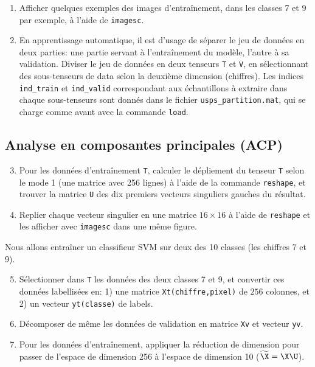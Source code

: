 \begin{enumerate}
	\item Afficher quelques exemples des images d'entraînement, dans les classes 7 et 9 par exemple, à l'aide de \texttt{imagesc}.

	\item En apprentissage automatique, il est d'usage de séparer le jeu de données en deux parties: une partie servant à l'entraînement du modèle, l'autre à sa validation. Diviser le jeu de données en deux tenseurs \texttt{T} et \texttt{V}, en sélectionnant des sous-tenseurs de data selon la deuxième dimension (chiffres). Les indices \texttt{ind\_train} et \texttt{ind\_valid} correspondant aux échantillons à extraire dans chaque sous-tenseurs sont donnés dans le fichier \texttt{usps\_partition.mat}, qui se charge comme avant avec la commande \texttt{load}.
\end{enumerate}

\subsection{Analyse en composantes principales (ACP)}

\begin{enumerate}
\setcounter{enumi}{2}
\item Pour les données d'entraînement \texttt{T}, calculer le dépliement du tenseur \texttt{T} selon le mode 1 (une matrice avec 256 lignes) à l'aide de la commande \texttt{reshape}, et trouver la matrice \texttt{U} des dix premiers vecteurs singuliers gauches du résultat. %

\item Replier chaque vecteur singulier en une matrice  $16 \times 16$ à l'aide de \texttt{reshape} et les afficher avec \texttt{imagesc} dans une même figure.
\end{enumerate}

Nous allons entraîner un classifieur SVM sur deux des 10 classes (les chiffres 7 et 9).

\begin{enumerate}
\setcounter{enumi}{4}
\item Sélectionner dans \texttt{T} les données des deux classes 7 et 9, et convertir ces données labellisées en: 1) une matrice \texttt{Xt(chiffre,pixel)} de $256$ colonnes, et 2) un vecteur \texttt{yt(classe)} de labels.

\item Décomposer de même les données de validation en matrice \texttt{Xv} et vecteur \texttt{yv}.

\item %
Pour les données d'entraînement, appliquer la réduction de dimension pour passer de l'espace de dimension 256 à l'espace de dimension 10 ($\widetilde{\X} = \X\U$).
\end{enumerate}